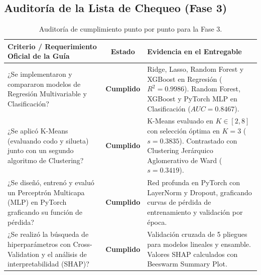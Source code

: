 \documentclass[11pt,letterpaper]{article}
\begin{document}
\subsection{Auditoría de la Lista de Chequeo (Fase 3)}

\begin{table}[H]
    \centering
    \small
    \caption{Auditoría de cumplimiento punto por punto para la Fase 3.}
    \label{tab:checklist_fase3}
    \begin{tabularx}{\linewidth}{p{8.5cm}cp{5.2cm}}
        \toprule
        \textbf{Criterio / Requerimiento Oficial de la Guía} & \textbf{Estado} & \textbf{Evidencia en el Entregable} \\
        \midrule
        ¿Se implementaron y compararon modelos de Regresión Multivariable y Clasificación? & \textbf{Cumplido} & Ridge, Lasso, Random Forest y XGBoost en Regresión ($R^2 = 0.9986$). Random Forest, XGBoost y PyTorch MLP en Clasificación ($AUC = 0.8467$). \\
        \addlinespace
        ¿Se aplicó K-Means (evaluando codo y silueta) junto con un segundo algoritmo de Clustering? & \textbf{Cumplido} & K-Means evaluado en $K \in [2, 8]$ con selección óptima en $K=3$ ($s=0.3835$). Contrastado con Clustering Jerárquico Aglomerativo de Ward ($s=0.3419$). \\
        \addlinespace
        ¿Se diseñó, entrenó y evaluó un Perceptrón Multicapa (MLP) en PyTorch graficando su función de pérdida? & \textbf{Cumplido} & Red profunda en PyTorch con LayerNorm y Dropout, graficando curvas de pérdida de entrenamiento y validación por época. \\
        \addlinespace
        ¿Se realizó la búsqueda de hiperparámetros con Cross-Validation y el análisis de interpretabilidad (SHAP)? & \textbf{Cumplido} & Validación cruzada de 5 pliegues para modelos lineales y ensamble. Valores SHAP calculados con Beeswarm Summary Plot. \\
        \bottomrule
    \end{tabularx}
\end{table}
\end{document}
